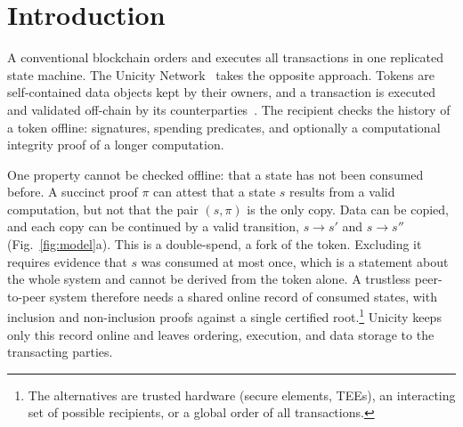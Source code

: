 \documentclass[runningheads]{llncs}
\begin{document}
\section{Introduction}

A conventional blockchain orders and executes all transactions in one replicated state machine. The Unicity Network~\cite{wp} takes the opposite approach. Tokens are self-contained data objects kept by their owners, and a transaction is executed and validated off-chain by its counterparties~\cite{exemodel}. The recipient checks the history of a token offline: signatures, spending predicates, and optionally a computational integrity proof of a longer computation.

One property cannot be checked offline: that a state has not been consumed before. A succinct proof $\pi$ can attest that a state $s$ results from a valid computation, but not that the pair $(s,\pi)$ is the only copy. Data can be copied, and each copy can be continued by a valid transition, $s \to s'$ and $s \to s''$ (Fig.~\ref{fig:model}a). This is a double-spend, a fork of the token. Excluding it requires evidence that $s$ was consumed at most once, which is a statement about the whole system and cannot be derived from the token alone. A trustless peer-to-peer system therefore needs a shared online record of consumed states, with inclusion and non-inclusion proofs against a single certified root.\footnote{The alternatives are trusted hardware (secure elements, TEEs), an interacting set of possible recipients, or a global order of all transactions.} Unicity keeps only this record online and leaves ordering, execution, and data storage to the transacting parties.
\end{document}
